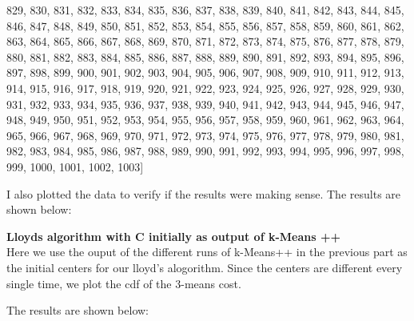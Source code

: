 \documentclass[11pt]{article}
\begin{document}
\begin{itemize}
829, 830, 831, 832, 833, 834, 835, 836, 837, 838, 839, 840, 841, 842, 843, 844, 845, 846, 847, 848, 849, 850, 851, 852, 853, 854, 855, 856, 857, 858, 859, 860, 861, 862, 863, 864, 865, 866, 867, 868, 869, 870, 871, 872, 873, 874, 875, 876, 877, 878, 879, 880, 881, 882, 883, 884, 885, 886, 887, 888, 889, 890, 891, 892, 893, 894, 895, 896, 897, 898, 899, 900, 901, 902, 903, 904, 905, 906, 907, 908, 909, 910, 911, 912, 913, 914, 915, 916, 917, 918, 919, 920, 921, 922, 923, 924, 925, 926, 927, 928, 929, 930, 931, 932, 933, 934, 935, 936, 937, 938, 939, 940, 941, 942, 943, 944, 945, 946, 947, 948, 949, 950, 951, 952, 953, 954, 955, 956, 957, 958, 959, 960, 961, 962, 963, 964, 965, 966, 967, 968, 969, 970, 971, 972, 973, 974, 975, 976, 977, 978, 979, 980, 981, 982, 983, 984, 985, 986, 987, 988, 989, 990, 991, 992, 993, 994, 995, 996, 997, 998, 999, 1000, 1001, 1002, 1003]
    	 
    	
    	
    	I also plotted the data to verify if the results were making sense. The results are shown below:
    	
    	\begin{figure}[H]%
    		\centering
    		\qquad
    	\end{figure}	
    	

\textbf{ Lloyds algorithm with C initially as output of k-Means ++ }\\
Here we use the ouput of the different runs of k-Means++ in the previous part as the initial centers for our lloyd's alogorithm. Since the centers are different every single time, we plot the cdf  of the 3-means cost.

The results are shown below:

\begin{figure}[H]%
	\centering
	\qquad
\end{figure}	


\end{itemize}
\end{document}
